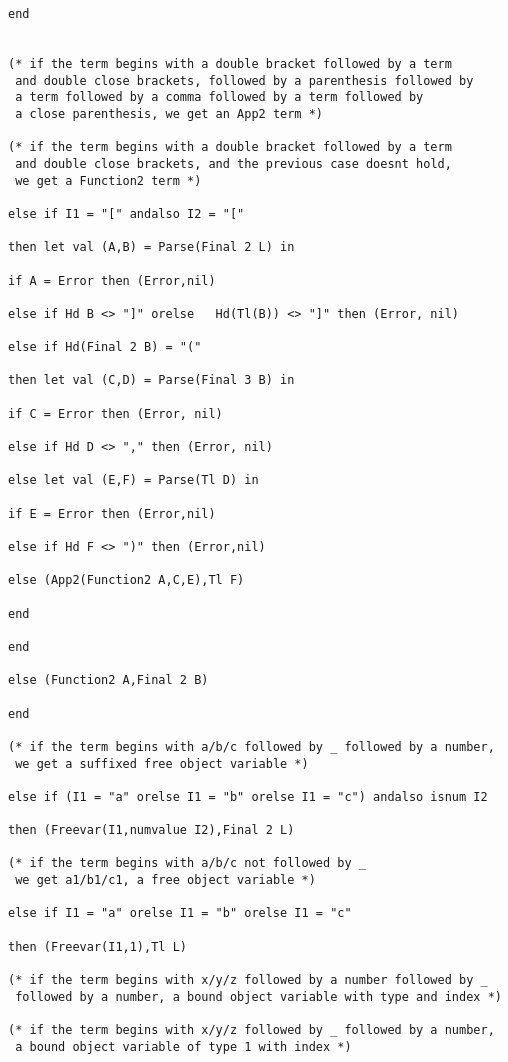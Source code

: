 \documentclass{article}
\begin{document}
{{\begin{verbatim}
end


(* if the term begins with a double bracket followed by a term
 and double close brackets, followed by a parenthesis followed by
 a term followed by a comma followed by a term followed by
 a close parenthesis, we get an App2 term *)

(* if the term begins with a double bracket followed by a term
 and double close brackets, and the previous case doesnt hold,
 we get a Function2 term *)

else if I1 = "[" andalso I2 = "["

then let val (A,B) = Parse(Final 2 L) in

if A = Error then (Error,nil)

else if Hd B <> "]" orelse   Hd(Tl(B)) <> "]" then (Error, nil)

else if Hd(Final 2 B) = "("

then let val (C,D) = Parse(Final 3 B) in

if C = Error then (Error, nil)

else if Hd D <> "," then (Error, nil)

else let val (E,F) = Parse(Tl D) in

if E = Error then (Error,nil)

else if Hd F <> ")" then (Error,nil)

else (App2(Function2 A,C,E),Tl F)

end

end

else (Function2 A,Final 2 B)

end

(* if the term begins with a/b/c followed by _ followed by a number,
 we get a suffixed free object variable *)

else if (I1 = "a" orelse I1 = "b" orelse I1 = "c") andalso isnum I2

then (Freevar(I1,numvalue I2),Final 2 L)

(* if the term begins with a/b/c not followed by _
 we get a1/b1/c1, a free object variable *)

else if I1 = "a" orelse I1 = "b" orelse I1 = "c"

then (Freevar(I1,1),Tl L)

(* if the term begins with x/y/z followed by a number followed by _
 followed by a number, a bound object variable with type and index *)

(* if the term begins with x/y/z followed by _ followed by a number,
 a bound object variable of type 1 with index *)


\end{verbatim}}}
\end{document}
